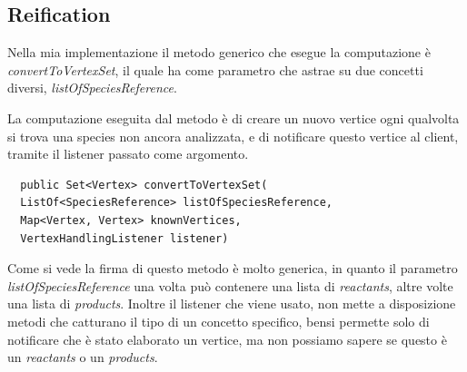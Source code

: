 \subsection*{Reification}
Nella mia implementazione il metodo generico che esegue la
computazione \`e \emph{convertToVertexSet}, il quale ha come parametro
che astrae su due concetti diversi, \emph{listOfSpeciesReference}. 

La computazione eseguita dal metodo \`e di creare un nuovo vertice
ogni qualvolta si trova una species non ancora analizzata, e di
notificare questo vertice al client, tramite il listener passato come
argomento.

\begin{lstlisting}
  public Set<Vertex> convertToVertexSet( 
  ListOf<SpeciesReference> listOfSpeciesReference, 
  Map<Vertex, Vertex> knownVertices,
  VertexHandlingListener listener) 
\end{lstlisting}
Come si vede la firma di questo metodo \`e molto generica, in quanto
il parametro \emph{listOfSpeciesReference} una volta pu\`o contenere
una lista di \emph{reactants}, altre volte una lista di
\emph{products}. Inoltre il listener che viene usato, non mette a
disposizione metodi che catturano il tipo di un concetto specifico,
bensi permette solo di notificare che \`e stato elaborato un vertice,
ma non possiamo sapere se questo \`e un \emph{reactants} o un
\emph{products}.

